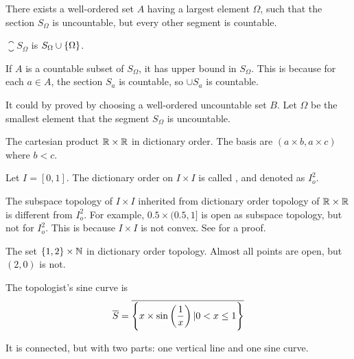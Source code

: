 \begin{definition}
    There exists a well-ordered set $A$ having a largest element $\Omega$, such that the section $S_\Omega$ is uncountable, but every other segment is countable.
    
    $\closure{S_\Omega}$ is $S_\Omega \cup \set{\Omega}$.
    
    If $A$ is a countable subset of $S_\Omega$, it has upper bound in $S_\Omega$. This is because for each $a \in A$, the section $S_a$ is countable, so $\cup S_a$ is countable.
    
    It could by proved by choosing a well-ordered uncountable set $B$. Let $\Omega$ be the smallest element that the segment $S_\Omega$ is uncountable.
\end{definition}

\begin{definition}[\cindex{$I_o^2$}]
    The cartesian product $\mathbb{R} \times \mathbb{R}$ in dictionary order. The basis are $(a\times b, a\times c)$ where $b < c$.
    
    Let $I=[0,1]$. The dictionary order on $I \times I$ is called , and denoted as $I_o^2$. 
    
    The subspace topology of $I \times I$ inherited from dictionary order topology of $\mathbb{R} \times \mathbb{R}$ is different from $I_o^2$. For example, $0.5 \times (0.5,1]$ is open as subspace topology, but not for $I_o^2$. This is because $I \times I$ is not convex. See  for a proof.
\end{definition}

\begin{definition}
    The set $\set{1,2} \times \mathbb{N}$ in dictionary order topology. Almost all points are open, but $(2,0)$ is not.
\end{definition}

\begin{definition}\label{topologist_sine_curve}
    The topologist's sine curve is
    \begin{equation}
        \overline{S} = \overline{\set{x \times \sin \left(\frac{1}{x} \right) | 0 < x \leq 1}}
    \end{equation}
    
    It is connected, but with two parts: one vertical line and one sine curve.
\end{definition}


